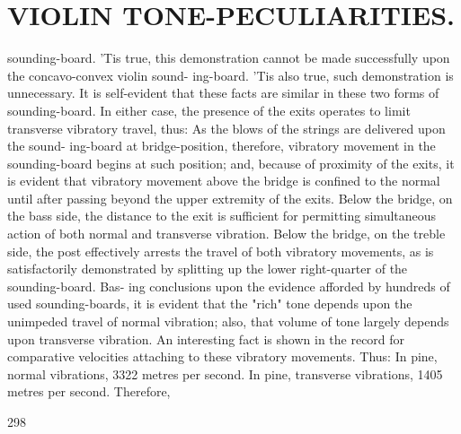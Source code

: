 \documentclass{article}
\begin{document}
\section*{VIOLIN TONE-PECULIARITIES.}
sounding-board. 'Tis true, this demonstration cannot be made successfully upon the concavo-convex violin sound- ing-board. 'Tis also true, such demonstration is unnecessary. It is self-evident that these facts are similar in these two forms of sounding-board. In either case, the presence of the exits operates to limit transverse vibratory travel, thus: As the blows of the strings are delivered upon the sound- ing-board at bridge-position, therefore, vibratory movement in the sounding-board begins at such position; and, because of proximity of the exits, it is evident that vibratory movement above the bridge is confined to the normal until after passing beyond the upper extremity of the exits. Below the bridge, on the bass side, the distance to the exit is sufficient for permitting simultaneous action of both normal and transverse vibration. Below the bridge, on the treble side, the post effectively arrests the travel of both vibratory movements, as is satisfactorily demonstrated by splitting up the lower right-quarter of the sounding-board. Bas- ing conclusions upon the evidence afforded by hundreds of used sounding-boards, it is evident that the "rich" tone depends upon the unimpeded travel of normal vibration; also, that volume of tone largely depends upon transverse vibration. An interesting fact is shown in the record for comparative velocities attaching to these vibratory movements. Thus: In pine, normal vibrations, 3322 metres per second. In pine, transverse vibrations, 1405 metres per second. Therefore,

298
\end{document}
